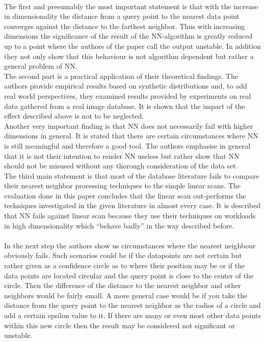 \documentclass[a4paper,psfig,subfigure,epsfig,fleqn,amssmb,float,caption,fontenc,ausarbeitung]{article}
\begin{document}
\paragraph{}
The first and presumably the most important statement is that with the increase in dimensionality the distance from a query point to the nearest data point converges against the distance to the farthest neighbor. Thus with increasing dimensions the significance of the result of the NN-algorithm is greatly reduced up to a point where the authors of the paper call the output unstable. In addition they not only show that this behaviour is not algorithm dependent but rather a general problem of NN. \\
The second part is a practical application of their theoretical findings. The authors provide empirical results based on synthetic distributions and, to add real world perspectives, they examined results provided by experiments on real data gathered from a real image database. It is shown that the impact of the effect described above is not to be neglected. \\
Another very important finding is that NN does not necessarily fail with higher dimensions in general. It is stated that there are certain circumstances where NN is still meaningful and therefore a good tool. The authors emphasise in general that it is not their intention to render NN useless but rather show that NN should not be misused without any thorough consideration of the data set.\\
The third main statement is that most of the database literature fails to compare their nearest neighbor processing techniques to the simple linear scans. The evaluation done in this paper concludes that the linear scan out-performs the techniques investigated in the given literature in almost every case. It is described that NN fails against linear scan because they use their techniques on workloads  in high dimensionality which “behave badly” in the way described before.
\paragraph{}
In the next step the authors show us circumstances where the nearest neighbour obviously fails. Such scenarios could be if the datapoints are not certain but rather given as a confidence circle as to where their position may be or if the data points are located circular and the query point is close to the center of the circle. Then the difference of the distance to the nearest neighbor and other neighbors would be fairly small. 
A more general case would be if you take the distance from the query point to the nearest neighbor as the radios of a circle and add a certain epsilon value to it. If there are many or even most other data points within this new circle then the result may be considered not significant or unstable. 
\end{document}
